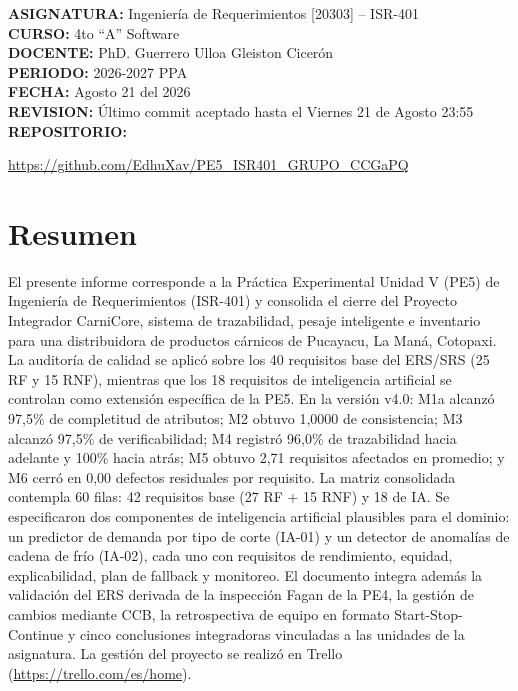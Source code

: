 \documentclass[11pt,a4paper]{article}
\begin{document}
\begin{titlepage}
  {\large \textbf{ASIGNATURA:}} Ingeniería de Requerimientos [20303] -- ISR-401\\[0.30cm]
  {\large \textbf{CURSO:}} 4to ``A'' Software\\[0.30cm]
  {\large \textbf{DOCENTE:}} PhD. Guerrero Ulloa Gleiston Cicerón\\[0.30cm]
  {\large \textbf{PERIODO:}} 2026-2027 PPA\\[0.30cm]
  {\large \textbf{FECHA:}} Agosto 21 del 2026\\[0.30cm]
    {\large \textbf{REVISION:}} Último commit aceptado hasta el Viernes 21 de Agosto 23:55\\[0.30cm]


  {\large \textbf{REPOSITORIO:}}

  \url{https://github.com/EdhuXav/PE5_ISR401_GRUPO_CCGaPQ}

\end{titlepage}

\newpage
\section*{Resumen}

El presente informe corresponde a la Práctica Experimental Unidad V (PE5) de Ingeniería de Requerimientos (ISR-401) y consolida el cierre del Proyecto Integrador CarniCore, sistema de trazabilidad, pesaje inteligente e inventario para una distribuidora de productos cárnicos de Pucayacu, La Maná, Cotopaxi. La auditoría de calidad se aplicó sobre los 40 requisitos base del ERS/SRS (25 RF y 15 RNF), mientras que los 18 requisitos de inteligencia artificial se controlan como extensión específica de la PE5. En la versión v4.0: M1a alcanzó 97,5\% de completitud de atributos; M2 obtuvo 1,0000 de consistencia; M3 alcanzó 97,5\% de verificabilidad; M4 registró 96,0\% de trazabilidad hacia adelante y 100\% hacia atrás; M5 obtuvo 2,71 requisitos afectados en promedio; y M6 cerró en 0,00 defectos residuales por requisito. La matriz consolidada contempla 60 filas: 42 requisitos base (27 RF + 15 RNF) y 18 de IA. Se especificaron dos componentes de inteligencia artificial plausibles para el dominio: un predictor de demanda por tipo de corte (IA-01) y un detector de anomalías de cadena de frío (IA-02), cada uno con requisitos de rendimiento, equidad, explicabilidad, plan de fallback y monitoreo. El documento integra además la validación del ERS derivada de la inspección Fagan de la PE4, la gestión de cambios mediante CCB, la retrospectiva de equipo en formato Start-Stop-Continue y cinco conclusiones integradoras vinculadas a las unidades de la asignatura. La gestión del proyecto se realizó en Trello (\url{https://trello.com/es/home}).
\end{document}
